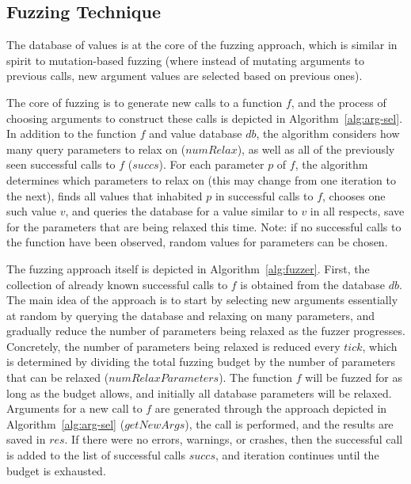 \documentclass[sigplan,anonymous,review]{acmart}
\begin{document}
\subsection{Fuzzing Technique}

The database of values is at the core of the fuzzing approach, which is similar in spirit to mutation-based fuzzing (where instead of mutating arguments to previous calls, new argument values are selected based on previous ones).

The core of fuzzing is to generate new calls to a function $f$, and the process of choosing arguments to construct these calls is depicted in Algorithm~\ref{alg:arg-sel}.
In addition to the function $f$ and value database $db$, the algorithm considers how many query parameters to relax on ($numRelax$), as well as all of the previously seen successful calls to $f$ ($succs$).
For each parameter $p$ of $f$, the algorithm determines which parameters to relax on (this may change from one iteration to the next), finds all values that inhabited $p$ in successful calls to $f$, chooses one such value $v$, and queries the database for a value similar to $v$ in all respects, save for the parameters that are being relaxed this time.
Note: if no successful calls to the function have been observed, random values for parameters can be chosen.

The fuzzing approach itself is depicted in Algorithm~\ref{alg:fuzzer}.
First, the collection of already known successful calls to $f$ is obtained from the database $db$.
The main idea of the approach is to start by selecting new arguments essentially at random by querying the database and relaxing on many parameters, and gradually reduce the number of parameters being relaxed as the fuzzer progresses.
Concretely, the number of parameters being relaxed is reduced every $tick$, which is determined by dividing the total fuzzing budget by the number of parameters that can be relaxed ($numRelaxParameters$).
The function $f$ will be fuzzed for as long as the budget allows, and initially all database parameters will be relaxed.
Arguments for a new call to $f$ are generated through the approach depicted in Algorithm~\ref{alg:arg-sel} ($getNewArgs$), the call is performed, and the results are saved in $res$.
If there were no errors, warnings, or crashes, then the successful call is added to the list of successful calls $succs$, and iteration continues until the budget is exhausted.


\end{document}
